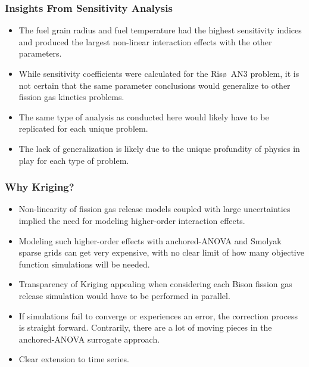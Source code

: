 \begin{frame}
\frametitle{Insights From Sensitivity Analysis}

\begin{itemize}
  \item The fuel grain radius and fuel temperature had the highest sensitivity indices and produced the largest non-linear interaction effects with the other parameters. 
  \item While sensitivity coefficients were calculated for the Ris\o~AN3 problem, it is not certain that the same parameter conclusions would generalize to other fission gas kinetics problems. 
  \item The same type of analysis as conducted here would likely have to be replicated for each unique problem. 
  \item The lack of generalization is likely due to the unique profundity of physics in play for each type of problem. 
\end{itemize}

\end{frame}
\begin{frame}
\frametitle{Why Kriging?}

\begin{itemize}
  \item Non-linearity of fission gas release models coupled with large uncertainties implied the need for modeling higher-order interaction effects. 
  \item Modeling such higher-order effects with anchored-ANOVA and Smolyak sparse grids can get very expensive, with no clear limit of how many objective function simulations will be needed. 
  \item Transparency of Kriging appealing when considering each Bison fission gas release simulation would have to be performed in parallel.
  \item If simulations fail to converge or experiences an error, the correction process is straight forward. Contrarily, there are a lot of moving pieces in the anchored-ANOVA surrogate approach. 
  \item Clear extension to time series. 
\end{itemize}

\end{frame}
